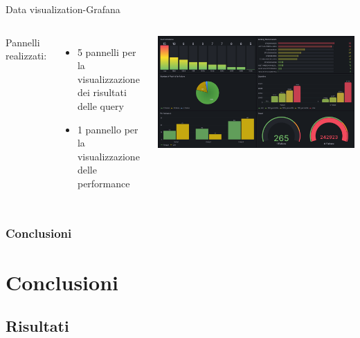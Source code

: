 \documentclass[13pt,aspectratio=169,t,xcolor=table]{beamer}
\begin{document}
\begin{frame}{Data visualization-Grafana}
    \vspace{0.5cm}
    \begin{columns}
            \begin{minipage}[b]{1\textwidth}
                Pannelli realizzati:
                \begin{itemize}
                    \item 5 pannelli per la visualizzazione dei risultati delle query
                    \item 1 pannello per la visualizzazione delle performance
                \end{itemize}
            \end{minipage}
            \begin{minipage}{1\textwidth}
                \begin{adjustbox}{margin=0cm 0cm 1.5cm 0cm, center}
                    \includegraphics[width=1\textwidth]{res/grafana_dashboard.png}
                \end{adjustbox}
            \end{minipage}
    \end{columns}
\end{frame}


\begin{frame}{}
    \frametitle{Conclusioni}
\end{frame}
\section{Conclusioni}
\subsection{Risultati}
\end{document}

